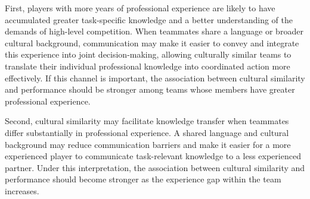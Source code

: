 \documentclass[10pt]{article}
\begin{document}

First, players with more years of professional experience are likely to have accumulated greater task-specific knowledge and a better understanding of the demands of high-level competition. When teammates share a language or broader cultural background, communication may make it easier to convey and integrate this experience into joint decision-making, allowing culturally similar teams to translate their individual professional knowledge into coordinated action more effectively. If this channel is important, the association between cultural similarity and performance should be stronger among teams whose members have greater professional experience. 

Second, cultural similarity may facilitate knowledge transfer when teammates differ substantially in professional experience. A shared language and cultural background may reduce communication barriers and make it easier for a more experienced player to communicate task-relevant knowledge to a less experienced partner. Under this interpretation, the association between cultural similarity and performance should become stronger as the experience gap within the team increases. %


\end{document}
